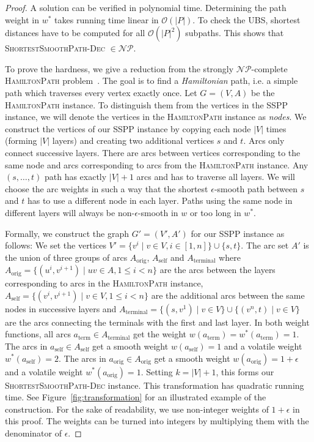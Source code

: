 \documentclass[a4paper,UKenglish,cleveref, autoref, thm-restate]{lipics-v2021}
\begin{document}
\begin{proof}
A solution can be verified in polynomial time.
Determining the path weight in $w^*$ takes running time linear in $\mathcal{O}(|P|)$.
To check the UBS, shortest distances have to be computed for all $\mathcal{O}(|P|^2)$ subpaths.
This shows that \textsc{ShortestSmoothPath-Dec} $\in \mathcal{NP}$.

To prove the hardness, we give a reduction from the strongly $\mathcal{NP}$-complete \textsc{HamiltonPath} problem~\cite{gj-ci-79}.
The goal is to find a \emph{Hamiltonian} path, i.e. a simple path which traverses every vertex exactly once.
Let $G=(V,A)$ be the \textsc{HamiltonPath} instance.
To distinguish them from the vertices in the SSPP instance, we will denote the vertices in the \textsc{HamiltonPath} instance as \emph{nodes}.
We construct the vertices of our SSPP instance by copying each node $|V|$ times (forming $|V|$ layers) and creating two additional vertices $s$ and $t$.
Arcs only connect successive layers.
There are arcs between vertices corresponding to the same node and arcs corresponding to arcs from the \textsc{HamiltonPath} instance.
Any $(s,\dots,t)$ path has exactly $|V|+1$ arcs and has to traverse all layers.
We will choose the arc weights in such a way that the shortest $\epsilon$-smooth path between $s$ and $t$ has to use a different node in each layer.
Paths using the same node in different layers will always be non-$\epsilon$-smooth in $w$ or too long in $w^*$.

Formally, we construct the graph $G'=(V',A')$ for our SSPP instance as follows:
We set the vertices $V' = \{ v^i \mid v \in V, i \in [1,n] \} \cup \{s,t\}$.
The arc set $A'$ is the union of three groups of arcs $A_{\operatorname{orig}}$, $A_{\operatorname{self}}$ and $A_{\operatorname{terminal}}$ where $A_{\operatorname{orig}} = \{ (u^i, v^{i+1}) \mid uv \in A, 1 \leq i < n \}$ are the arcs between the layers corresponding to arcs in the \textsc{HamiltonPath} instance, $A_{\operatorname{self}} = \{ (v^i, v^{i+1}) \mid v \in V, 1 \leq i < n \}$ are the additional arcs between the same nodes in successive layers and $A_{\operatorname{terminal}} = \{ (s, v^1) \mid v \in V \} \cup \{ (v^n, t) \mid v \in V \}$ are the arcs connecting the terminals with the first and last layer.
In both weight functions, all arcs $a_{\operatorname{term}} \in A_{\operatorname{terminal}}$ get the weight $w(a_{\operatorname{term}}) = w^*(a_{\operatorname{term}}) = 1$.
The arcs in $a_{\operatorname{self}} \in A_{\operatorname{self}}$ get a smooth weight $w(a_{\operatorname{self}}) = 1$ and a volatile weight $w^*(a_{\operatorname{self}}) = 2$.
The arcs in $a_{\operatorname{orig}} \in A_{\operatorname{orig}}$ get a smooth weight $w(a_{\operatorname{orig}}) = 1+\epsilon$ and a volatile weight $w^*(a_{\operatorname{orig}}) = 1$.
Setting $k=|V|+1$, this forms our \textsc{ShortestSmoothPath-Dec} instance.
This transformation has quadratic running time.
See Figure~\ref{fig:transformation} for an illustrated example of the construction.
For the sake of readability, we use non-integer weights of $1+\epsilon$ in this proof.
The weights can be turned into integers by multiplying them with the denominator of $\epsilon$.


\end{proof}
\end{document}
